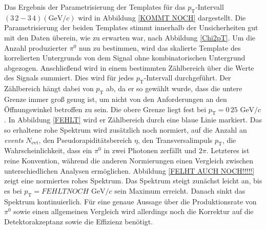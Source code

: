 Das Ergebnis der Parametrisierung der Templates für das $p_\text{T}$-Intervall $(3\,2-3\,4)(\text{GeV/}c)$ wird in Abbildung \ref{KOMMT NOCH} dargestellt.
Die Parametrisierung der beiden Templates stimmt innerhalb der Unsicherheiten gut mit den Daten überein, wie zu erwarten war, nach Abbildung \ref{Chi2pT}.
\newline
Um die Anzahl produzierter $\pi^{0}$ nun zu bestimmen, wird das skalierte Template des korrelierten Untergrunds von dem Signal ohne kombinatorischen Untergrund abgezogen.
Anschließend wird in einem bestimmten Zählbereich über die Werte des Signals summiert.
Dies wird für jedes $p_\text{T}$-Intervall durchgeführt.
\newline
Der Zählbereich hängt dabei von $p_\text{T}$ ab, da er so gewählt wurde, dass die untere Grenze immer groß genug ist, um nicht von den Anforderungen an den Öffnungswinkel betroffen zu sein.
Die obere Grenze liegt fest bei $p_\text{T} = 0\,25 \text{ GeV}/c$.
In Abbildung \ref{FEHLT} wird er Zählbereich durch eine blaue Linie markiert.
\newline
Das so erhaltene rohe Spektrum wird zusätzlich noch normiert, auf die Anzahl an \textit{events} $N_\text{evt}$, den Pseudorapiditätsbereich $\eta$, den Transversalimpuls $p_\text{T}$, die Wahrscheinlichkeit, dass ein $\pi^{0}$ in zwei Photonen zerfällt und $2\pi$.
Letzteres ist reine Konvention, während die anderen Normierungen einen Vergleich zwischen unterschiedlichen Analysen ermöglichen.
Abbildung \ref{FELHT AUCH NOCH!!!!!} zeigt eine normiertes rohes Spektrum.
Das Spektrum steigt zunächst leicht an, bis es bei $p_\text{T} = FEHLT NOCH\text{ GeV}/c$ sein Maximum erreicht.
Danach sinkt das Spektrum kontinuierlich.
\newline
Für eine genaue Aussage über die Produktionsrate von $\pi^{0}$ sowie einen allgemeinen Vergleich wird allerdings noch die Korrektur auf die Detektorakzeptanz sowie die Effizienz benötigt.